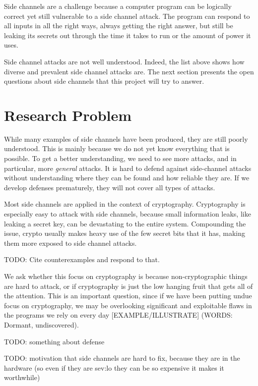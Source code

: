 \documentclass{acm_proc_article-sp}
\begin{document}
Side channels are a challenge because a computer program can be logically
correct yet still vulnerable to a side channel attack. The program can respond
to all inputs in all the right ways, always getting the right answer, but still
be leaking its secrets out through the time it takes to run or the amount of
power it uses.

Side channel attacks are not well understood. Indeed, the list above shows how
diverse and prevalent side channel attacks are. The next section presents the
open questions about side channels that this project will try to answer.

\section{Research Problem}

While many examples of side channels have been produced, they are still poorly
understood. This is mainly because we do not yet know everything that is
possible. To get a better understanding, we need to see more attacks, and in
particular, more \emph{general} attacks. It is hard to defend against
side-channel attacks without understanding where they can be found and how
reliable they are. If we develop defenses prematurely, they will not cover all
types of attacks.

Most side channels are applied in the context of cryptography. Cryptography is
especially easy to attack with side channels, because small information leaks,
like leaking a secret key, can be devastating to the entire system. Compounding
the issue, crypto usually makes heavy use of the few secret bits that it has,
making them more exposed to side channel attacks.

TODO: Cite counterexamples and respond to that.

We ask whether this focus on cryptography is because non-cryptographic things
are hard to attack, or if cryptography is just the low hanging fruit that gets
all of the attention. This is an important question, since if we have been
putting undue focus on cryptography, we may be overlooking significant and
exploitable flaws in the programs we rely on every day [EXAMPLE/ILLUSTRATE]
(WORDS: Dormant, undiscovered).

TODO: something about defense

TODO: motivation that side channels are hard to fix, because they are in the
hardware (so even if they are sev:lo they can be so expensive it makes it
worthwhile)
\end{document}
